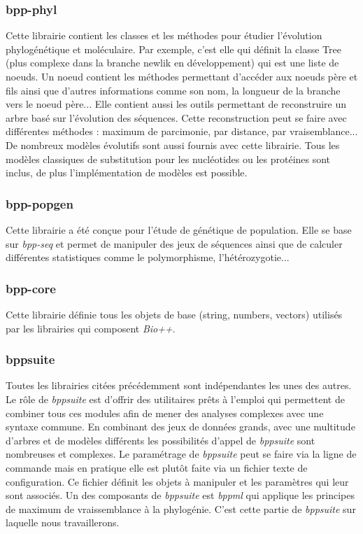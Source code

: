 	\subsubsection*{bpp-phyl}
	Cette librairie contient les classes et les méthodes pour étudier l'évolution phylogénétique et moléculaire. Par exemple, c'est elle qui définit la classe Tree (plus complexe dans la branche newlik en développement) qui est une liste de noeuds. Un noeud contient les méthodes permettant d'accéder aux noeuds père et fils ainsi que d'autres informations comme son nom, la longueur de la branche vers le noeud père...
	Elle contient aussi les outils permettant de reconstruire un arbre basé sur l'évolution des séquences. Cette reconstruction peut se faire avec différentes méthodes : maximum de parcimonie, par distance, par vraisemblance...
	De nombreux modèles évolutifs sont aussi fournis avec cette librairie. Tous les modèles classiques de substitution pour les nucléotides ou les protéines sont inclus, de plus l'implémentation de modèles est possible.
	\subsubsection*{bpp-popgen}
	Cette librairie a été conçue pour l'étude de génétique de population. Elle se base sur \textit{bpp-seq} et permet de manipuler des jeux de séquences ainsi que de calculer différentes statistiques comme le polymorphisme, l'hétérozygotie...
	
	\subsubsection*{bpp-core}
	Cette librairie définie tous les objets de base (string, numbers, vectors) utilisés par les librairies qui composent \textit{Bio++}.
	
	\subsubsection*{bppsuite}
	Toutes les librairies citées précédemment sont indépendantes les unes des autres. Le rôle de \textit{bppsuite} est d'offrir des utilitaires prêts à l'emploi qui permettent de combiner tous ces modules afin de mener des analyses complexes avec une syntaxe commune. En combinant des jeux de données grands, avec une multitude d'arbres et de modèles différents les possibilités d'appel de \textit{bppsuite} sont nombreuses et complexes. Le paramétrage de \textit{bppsuite} peut se faire via la ligne de commande mais en pratique elle est plutôt faite via un fichier texte de configuration. Ce fichier définit les objets à manipuler et les paramètres qui leur sont associés.
	Un des composants de \textit{bppsuite} est \textit{bppml} qui applique les principes de maximum de vraissemblance à la phylogénie. C'est cette partie de \textit{bppsuite} sur laquelle nous travaillerons.
	

